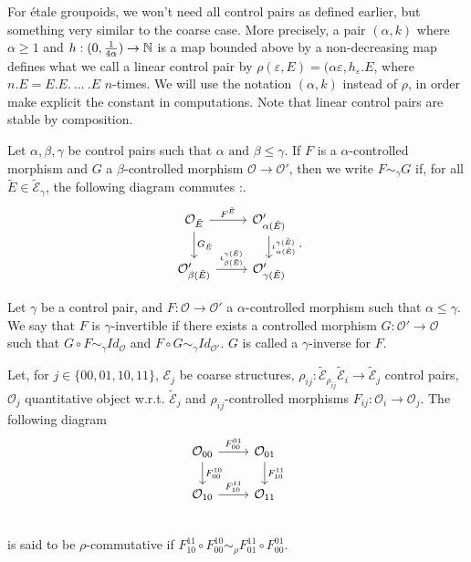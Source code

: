\begin{rk}\label{LinearCP}
For étale groupoids, we won't need all control pairs as defined earlier, but something very similar to the coarse case. More precisely, a pair $(\alpha,k)$ where $\alpha\geq 1$ and $h : (0,\frac{1}{4\alpha})\rightarrow \mathbb N $ is a map bounded above by a non-decreasing map defines what we call a linear control pair by $\rho(\varepsilon,E)=(\alpha\varepsilon, h_\varepsilon . E$, where $n.E=E.E.\ ...\ .E$ $n$-times. We will use the notation $(\alpha,k)$ instead of $\rho$, in order make explicit the constant in computations. Note that linear control pairs are stable by composition. 
\end{rk}

Let $\alpha,\beta,\gamma$ be control pairs such that $\alpha \text{ and }\beta\leq \gamma$. If $F$ is a $\alpha$-controlled morphism and $G$ a $\beta$-controlled morphism $\mathcal O\rightarrow \mathcal O'$, then we write $F\sim_\gamma G$ if, for all $\tilde E\in \mathcal{\tilde E}_\gamma$, the following diagram commutes :.\[\begin{tikzcd}
\mathcal O_{\tilde E} \arrow{r}{F^{\tilde E}}\arrow{d}{G_{\tilde E}} & \mathcal O'_{\alpha(\tilde E)} \arrow{d}{\iota_{\alpha(\tilde E)}^{\gamma(\tilde E)}} \\
\mathcal O'_{\beta(\tilde E)}\arrow{r}{\iota_{\beta(\tilde E)}^{\gamma(\tilde E)}} & \mathcal O'_{\gamma(\tilde E)}
\end{tikzcd}.\]

\begin{definition}Let $\gamma$ be a control pair, and $F: \mathcal O\rightarrow \mathcal O'$ a $\alpha$-controlled morphism such that $\alpha \leq \gamma$. We say that $F$ is $\gamma$-invertible if there exists a controlled morphism $G: \mathcal O'\rightarrow \mathcal O$ such that $G\circ F \sim_\gamma Id_{\mathcal O}$ and $F\circ G \sim_\gamma Id_{\mathcal O'}$. $G$ is called a $\gamma$-inverse for $F$. \end{definition}

\begin{definition}
Let, for $j\in\{00,01,10,11\}$, $\mathcal{E}_j$ be coarse structures, $\rho_{ij} :\mathcal{\tilde E}_{\rho_{ij}} \mathcal{\tilde E}_i\rightarrow \mathcal{\tilde E}_j$ control pairs, $\mathcal O_j$ quantitative object w.r.t. $\mathcal{\tilde E}_j$ and $\rho_{ij}$-controlled morphisms $F_{ij} : \mathcal O_i\rightarrow \mathcal O_j$. The following diagram
\[\begin{tikzcd}
\mathcal O_{00}\arrow{r}{F_{00}^{01}}\arrow{d}{F_{00}^{10}} & \mathcal O_{01}\arrow{d}{F_{10}^{11}} \\
\mathcal O_{10}\arrow{r}{F_{10}^{11}} & \mathcal O_{11}\\	 
\end{tikzcd}\]
is said to be $\rho$-commutative if $F_{10}^{11}\circ F_{00}^{10} \sim_\rho F_{01}^{11}\circ F_{00}^{01}$.
\end{definition}

